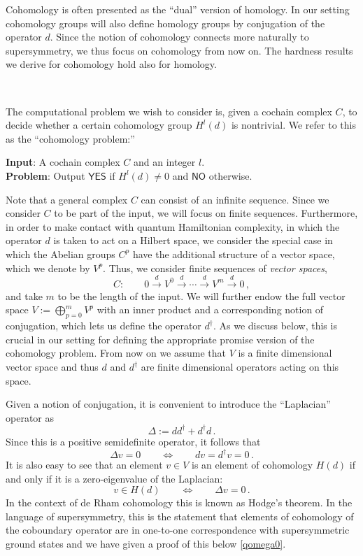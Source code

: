 \documentclass[11pt]{article}
\numberwithin{equation}{section}
\newcommand{\yes}{\mathsf{YES}}
\newcommand{\no}{\mathsf{NO}}
\newcommand\equ[1] {\begin{equation}#1\end{equation}}
\renewcommand\( {\left(}
\renewcommand\) {\right)}
\begin{document}
Cohomology is often presented as the ``dual'' version of homology. In our setting cohomology groups will also define homology groups by conjugation of the operator $d$. Since the notion of cohomology connects more naturally to supersymmetry, we thus focus on cohomology from now on. The hardness results we derive for cohomology hold also for homology. 

\ 


The computational problem we wish to consider is, given a cochain complex $C$, to decide whether a certain cohomology group $H^l(d)$ is nontrivial. We refer to this as the ``cohomology problem:''\\

 \par\noindent  
   {\bfseries Input}: A cochain complex $C$  and an integer $l$.\\
   {\bfseries Problem}: Output $\yes$ if $H^{l}(d)\neq 0$ and $\no$ otherwise.\\
   \par



\noindent Note that a general complex $C$ can consist of an infinite sequence. Since we consider $C$ to be part of the input, we will focus on finite sequences. Furthermore, in order to make contact with quantum Hamiltonian complexity, in which the operator $d$ is taken to act on a Hilbert space, we consider the special case in which the Abelian groups $C^{p}$ have the additional structure of a vector space, which we denote by $V^{p}$. Thus, we consider finite sequences of {\it vector spaces},
\equ{\label{cochainVp}
C:\qquad 0\xrightarrow{d} V^{0}\xrightarrow{d} \cdots \xrightarrow{d} V^{m}\xrightarrow{d} 0\,,
}
and take $m$ to be the length of the input. We will further endow the full vector space $V:=\bigoplus_{p=0}^{m}V^{p}$ with an inner product and a corresponding notion of conjugation, which lets us define the operator $d^{\dagger}$. As we discuss below, this is crucial in our setting for defining the appropriate promise version of the cohomology problem.   From now on we assume that $V$ is a finite dimensional vector space and thus $d$ and $d^\dagger$ are finite dimensional operators acting on this space. 


Given a notion of conjugation, it is convenient to introduce the ``Laplacian'' operator as 
\equ{
\Delta:= dd^{\dagger}+d^{\dagger}d\,.
}
Since this is a positive semidefinite operator, it follows that 
\equ{
\Delta v =0 \qquad \Leftrightarrow \qquad  dv  =d^\dagger v=0\,.
}
It is also easy to see that an element $v\in V$ is an element of cohomology $H(d)$ if and only if it is a zero-eigenvalue of the Laplacian:
\equ{\label{Hodge}
v\in H(d) \qquad \Leftrightarrow \qquad \Delta v=0\,.
}
In the context of de Rham cohomology this is known as Hodge's theorem. In the language of supersymmetry, this is the statement that elements of cohomology of the coboundary operator are in one-to-one correspondence with supersymmetric ground states and we have given a proof of this below  \eqref{qomega0}.
\end{document}
